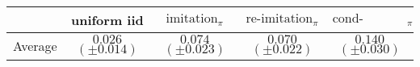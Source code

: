 \begin{tabular}{lcccc}
\toprule
 & uniform iid & $\text{imitation}_{\pi}$ & $\text{re-imitation}_{\pi}$ & $\text{cond-imitation}_{\pi}$ \\
\midrule
Average & $0.026$ $(\pm 0.014)$ & $0.074$ $(\pm 0.023)$ & $0.070$ $(\pm 0.022)$ & $0.140$ $(\pm 0.030)$ \\
\bottomrule
\end{tabular}
